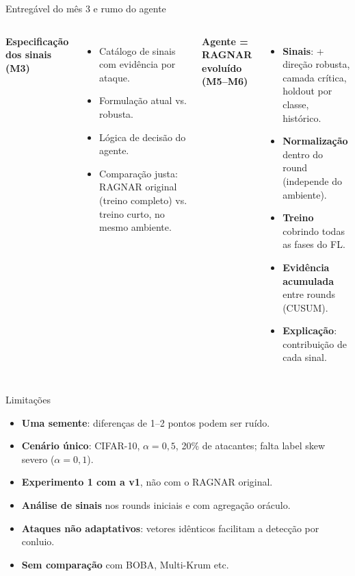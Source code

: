 \documentclass[aspectratio=169,11pt,xcolor=table]{beamer}
\begin{document}

\begin{frame}{Entregável do mês 3 e rumo do agente}
  \begin{columns}[T]
    \textbf{Especificação dos sinais (M3)}
    \begin{itemize}
      \item Catálogo de sinais com evidência por ataque.
      \item Formulação atual vs. robusta.
      \item Lógica de decisão do agente.
      \item Comparação justa: RAGNAR original (treino completo) vs. treino curto, no mesmo ambiente.
    \end{itemize}
    \textbf{Agente = RAGNAR evoluído (M5--M6)}
    \begin{itemize}
      \item \textbf{Sinais}: + direção robusta, camada crítica, holdout por classe, histórico.
      \item \textbf{Normalização} dentro do round (independe do ambiente).
      \item \textbf{Treino} cobrindo todas as fases do FL.
      \item \textbf{Evidência acumulada} entre rounds (CUSUM).
      \item \textbf{Explicação}: contribuição de cada sinal.
    \end{itemize}
  \end{columns}
\end{frame}

\begin{frame}{Limitações}
  \begin{itemize}
    \item \textbf{Uma semente}: diferenças de 1--2 pontos podem ser ruído.
    \item \textbf{Cenário único}: CIFAR-10, $\alpha=0{,}5$, 20\% de atacantes; falta label skew severo ($\alpha=0{,}1$).
    \item \textbf{Experimento 1 com a v1}, não com o RAGNAR original.
    \item \textbf{Análise de sinais} nos rounds iniciais e com agregação oráculo.
    \item \textbf{Ataques não adaptativos}: vetores idênticos facilitam a detecção por conluio.
    \item \textbf{Sem comparação} com BOBA, Multi-Krum etc.
  \end{itemize}
\end{frame}

\end{document}
